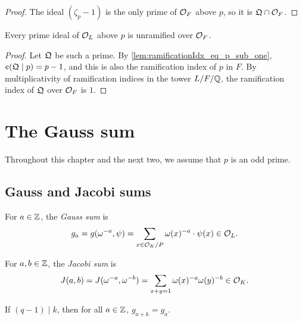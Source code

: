 \begin{proof}
  \leanok
  The ideal $(\zeta_p - 1)$ is the only prime of $\mathcal{O}_F$ above $p$, so it is
  $\mathfrak{Q} \cap \mathcal{O}_F$.
\end{proof}

\begin{lemma}
  \label{lem:ramificationIdx_under_eq_one}
  \leanok
  Every prime ideal of $\mathcal{O}_L$ above $p$ is unramified over $\mathcal{O}_F$.
\end{lemma}

\begin{proof}
  \leanok
  Let $\mathfrak{Q}$ be such a prime. By \ref{lem:ramificationIdx_eq_p_sub_one}, $e(\mathfrak{Q} \mid p) = p - 1$,
  and this is also the ramification index of $p$ in $F$. By multiplicativity of ramification
  indices in the tower $L/F/\mathbb{Q}$, the ramification index of $\mathfrak{Q}$ over $\mathcal{O}_F$ is $1$.
\end{proof}

\chapter{The Gauss sum}
\label{chap:gauss_sum}

Throughout this chapter and the next two, we assume that $p$ is an odd prime.

\section{Gauss and Jacobi sums}

\begin{definition}
  \label{def:gauss_sum_s}
  \leanok
  For $a \in \mathbb{Z}$, the \emph{Gauss sum} is
  \[
    g_a = g(\omega^{-a}, \psi) = \sum_{x \in \mathcal{O}_K/P} \omega(x)^{-a} \cdot \psi(x) \in \mathcal{O}_L.
  \]
\end{definition}

\begin{definition}
  \label{def:jacobi_sum}
  \leanok
  For $a, b \in \mathbb{Z}$, the \emph{Jacobi sum} is
  \[
    J(a, b) = J(\omega^{-a}, \omega^{-b}) = \sum_{x + y = 1} \omega(x)^{-a} \omega(y)^{-b} \in \mathcal{O}_K.
  \]
\end{definition}

\begin{lemma}
  \label{lem:GaussSum_periodic}
  \leanok
  If $(q-1) \mid k$, then for all $a \in \mathbb{Z}$, $g_{a+k} = g_a$.
\end{lemma}

